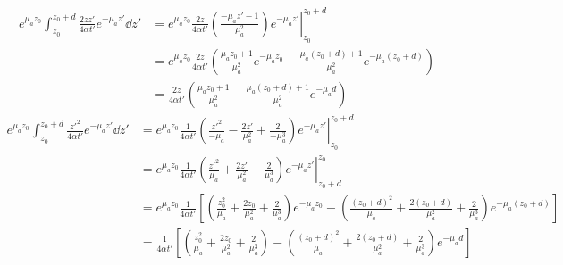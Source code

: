 \documentclass[]{article}
\begin{document}
\begin{align*}
   e^{\mu_a z_0}  \int_{z_0}^{z_0 + d}
   \frac{2zz'}{4\alpha t'} e^{-\mu_a z'}
   \dd z'
   &= e^{\mu_a z_0} \left.\frac{2z}{4\alpha t'} \left(\frac{-\mu_az' - 1}{\mu_a^2} \right)e^{-\mu_a z'} \right|_{z_0}^{z_0 + d} \\
     &= e^{\mu_a z_0} \frac{2z}{4\alpha t'} \left( \frac{\mu_a z_0 + 1}{\mu_a^2}e^{-\mu_a z_0} - \frac{\mu_a (z_0+d) + 1}{\mu_a^2}e^{-\mu_a (z_0+d)}\right) \\
         &=  \frac{2z}{4\alpha t'} \left( \frac{\mu_a z_0 + 1}{\mu_a^2} - \frac{\mu_a (z_0+d) + 1}{\mu_a^2}e^{-\mu_a d}\right)
\end{align*}
\begin{align*}
e^{\mu_a z_0}    \int_{z_0}^{z_0 + d}
   \frac{z'^2}{4\alpha t'} e^{-\mu_a z'}
   \dd z'
   &= e^{\mu_a z_0}\left.\frac{1}{4\alpha t'} \left( \frac{z'^2}{-\mu_a} - \frac{2z'}{\mu_a^2} + \frac{2}{-\mu_a^3} \right)e^{-\mu_a z'} \right|_{z_0}^{z_0 + d} \\
   &= e^{\mu_a z_0}\left.\frac{1}{4\alpha t'} \left( \frac{z'^2}{\mu_a} + \frac{2z'}{\mu_a^2} + \frac{2}{\mu_a^3} \right)e^{-\mu_a z'} \right|_{z_0 + d}^{z_0} \\
   &=
e^{\mu_a z_0}   \frac{1}{4\alpha t'}\left[
   \left( \frac{z_0^2}{\mu_a} + \frac{2z_0}{\mu_a^2} + \frac{2}{\mu_a^3} \right)e^{-\mu_a z_0} -
   \left( \frac{(z_0 + d)^2}{\mu_a} + \frac{2(z_0 + d)}{\mu_a^2} + \frac{2}{\mu_a^3} \right)e^{-\mu_a (z_0+d)}
   \right] \\
    &=
   \frac{1}{4\alpha t'}\left[
   \left( \frac{z_0^2}{\mu_a} + \frac{2z_0}{\mu_a^2} + \frac{2}{\mu_a^3} \right) -
   \left( \frac{(z_0 + d)^2}{\mu_a} + \frac{2(z_0 + d)}{\mu_a^2} + \frac{2}{\mu_a^3} \right)e^{-\mu_a d}
   \right]
\end{align*}
\end{document}
